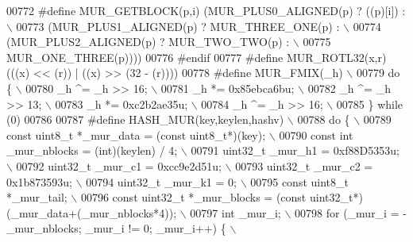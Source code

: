 \begin{DoxyCode}
{{{{{{{{00772 \textcolor{preprocessor}{#define MUR\_GETBLOCK(p,i) (MUR\_PLUS0\_ALIGNED(p) ? ((p)[i]) :           \(\backslash\)}
00773 \textcolor{preprocessor}{                            (MUR\_PLUS1\_ALIGNED(p) ? MUR\_THREE\_ONE(p) : \(\backslash\)}
00774 \textcolor{preprocessor}{                             (MUR\_PLUS2\_ALIGNED(p) ? MUR\_TWO\_TWO(p) :  \(\backslash\)}
00775 \textcolor{preprocessor}{                                                      MUR\_ONE\_THREE(p))))}
00776 \textcolor{preprocessor}{#endif}
00777 \textcolor{preprocessor}{#define MUR\_ROTL32(x,r) (((x) << (r)) | ((x) >> (32 - (r))))}
00778 \textcolor{preprocessor}{#define MUR\_FMIX(\_h) \(\backslash\)}
00779 \textcolor{preprocessor}{do \{                 \(\backslash\)}
00780 \textcolor{preprocessor}{  \_h ^= \_h >> 16;    \(\backslash\)}
00781 \textcolor{preprocessor}{  \_h *= 0x85ebca6bu; \(\backslash\)}
00782 \textcolor{preprocessor}{  \_h ^= \_h >> 13;    \(\backslash\)}
00783 \textcolor{preprocessor}{  \_h *= 0xc2b2ae35u; \(\backslash\)}
00784 \textcolor{preprocessor}{  \_h ^= \_h >> 16;    \(\backslash\)}
00785 \textcolor{preprocessor}{\} while (0)}
00786 
00787 \textcolor{preprocessor}{#define HASH\_MUR(key,keylen,hashv)                                     \(\backslash\)}
00788 \textcolor{preprocessor}{do \{                                                                   \(\backslash\)}
00789 \textcolor{preprocessor}{  const uint8\_t *\_mur\_data = (const uint8\_t*)(key);                    \(\backslash\)}
00790 \textcolor{preprocessor}{  const int \_mur\_nblocks = (int)(keylen) / 4;                          \(\backslash\)}
00791 \textcolor{preprocessor}{  uint32\_t \_mur\_h1 = 0xf88D5353u;                                      \(\backslash\)}
00792 \textcolor{preprocessor}{  uint32\_t \_mur\_c1 = 0xcc9e2d51u;                                      \(\backslash\)}
00793 \textcolor{preprocessor}{  uint32\_t \_mur\_c2 = 0x1b873593u;                                      \(\backslash\)}
00794 \textcolor{preprocessor}{  uint32\_t \_mur\_k1 = 0;                                                \(\backslash\)}
00795 \textcolor{preprocessor}{  const uint8\_t *\_mur\_tail;                                            \(\backslash\)}
00796 \textcolor{preprocessor}{  const uint32\_t *\_mur\_blocks = (const uint32\_t*)(\_mur\_data+(\_mur\_nblocks*4)); \(\backslash\)}
00797 \textcolor{preprocessor}{  int \_mur\_i;                                                          \(\backslash\)}
00798 \textcolor{preprocessor}{  for (\_mur\_i = -\_mur\_nblocks; \_mur\_i != 0; \_mur\_i++) \{                \(\backslash\)}
}}}}}}}}
\end{DoxyCode}
